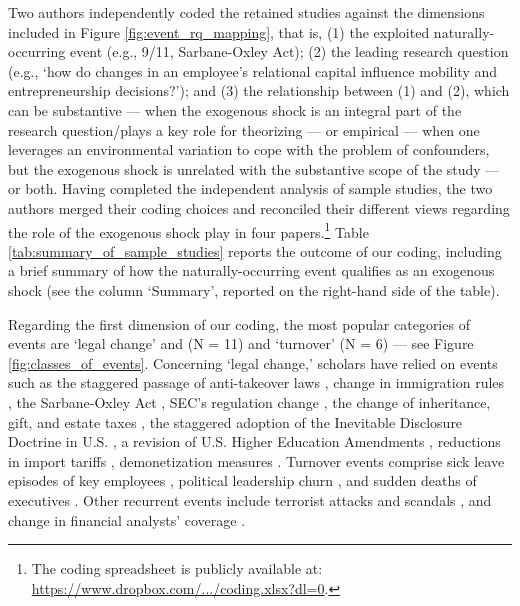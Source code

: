 \begin{refsection}
Two authors independently coded the retained studies against the dimensions 
included in Figure \ref{fig:event_rq_mapping}, that is, (1) the exploited 
naturally-occurring event (e.g., 9/11, Sarbane-Oxley Act); (2) the leading
research question (e.g., `how do changes in an employee's relational capital
influence mobility and entrepreneurship decisions?'); and (3) the relationship
between (1) and (2), which can be substantive --- when the exogenous shock is an
integral part of the research question/plays a key role for theorizing 
--- or empirical --- when one leverages an environmental variation to cope
with the problem of confounders, but the exogenous shock is unrelated with the
substantive scope of the study --- or both. Having completed the independent 
analysis of sample studies, the two authors merged their coding choices and 
reconciled their different views regarding the role of the exogenous shock play
in four papers.\footnote{The coding spreadsheet is publicly available at: \href{
https://www.dropbox.com/scl/fi/rt3110pvhbjcu6i7vp3to/coding.xlsx?dl=0}
{https://www.dropbox.com/.../coding.xlsx?dl=0}.} Table
\ref{tab:summary_of_sample_studies} reports the outcome of our coding, including
a brief summary of how the naturally-occurring event qualifies as an exogenous
shock (see the column `Summary', reported on the right-hand side of the table).

Regarding the first dimension of our coding, the most popular categories of 
events are `legal change' and (N = 11) and `turnover' (N = 6) --- see Figure 
\ref{fig:classes_of_events}. Concerning `legal change,' scholars have relied 
on events such as the staggered passage of anti-takeover laws 
\parencite{cabral202128,wang20162393}, change in immigration rules 
\parencite{choudhury2019203}, the Sarbane-Oxley Act \parencite{gupta2020802},
SEC's regulation change \parencite{jia2020290}, the change of 
inheritance, gift, and estate taxes \parencite{kang20201300}, 
the staggered adoption of the Inevitable Disclosure Doctrine in U.S.
\parencite{kang20201300}, a revision of U.S. Higher Education Amendments 
\parencite{krishnan20194522}, reductions in import tariffs 
\parencite{li20194011}, demonetization measures \parencite{natarajan20191070}.
Turnover events comprise sick leave episodes of key employees 
\parencite{chen20181239,drexler20142722,chown2015177,}, 
political leadership churn \parencite{gedefawbirhanu2020,byun20191368},
and sudden deaths of executives \parencite{koh20185725}. Other recurrent 
events include terrorist attacks \parencite{corbo2016323,vergne20121027,li20194011} and 
scandals \parencite{cai2019159,hilary2021}, and change in financial analysts'
coverage \parencite{chatterji2010917,qian20192271}.


\end{refsection}
